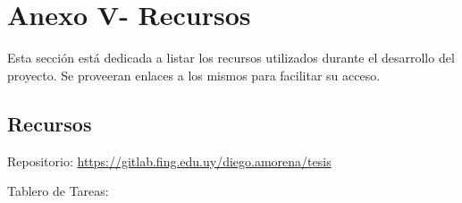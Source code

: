 \chapter{Anexo V- Recursos}
\label{chapter:A-5-Recursos} 

Esta sección está dedicada a listar los recursos utilizados durante el desarrollo del proyecto. Se proveeran enlaces a los mismos para facilitar su acceso.


\section{Recursos}
\label{section:Recursos}
\label{Recursos}

Repositorio: %
\url{https://gitlab.fing.edu.uy/diego.amorena/tesis}



Tablero de Tareas: %
